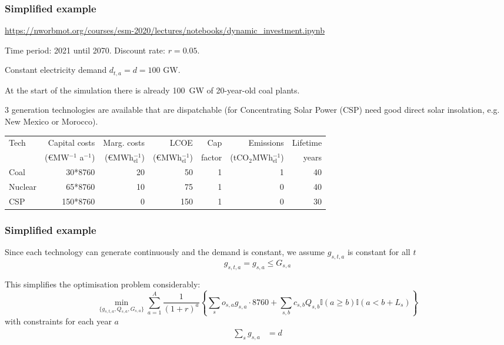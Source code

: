 \documentclass[10pt,aspectratio=169,dvipsnames]{beamer}
\newcommand{\ra}[1]{\renewcommand{\arraystretch}{#1}}
\begin{document}
\begin{frame}
  \frametitle{Simplified example}

  \url{https://nworbmot.org/courses/esm-2020/lectures/notebooks/dynamic_investment.ipynb}

  Time period: 2021 until 2070. Discount rate: $r = 0.05$.

  Constant electricity demand $d_{t,a} = d = 100$ GW.

  At the start of the simulation there is already 100~GW of 20-year-old coal plants.

  3 generation technologies are available that are dispatchable (for Concentrating Solar Power (CSP) need good direct solar insolation, e.g. New Mexico or Morocco).


  \ra{1.1}
  \begin{table}[!t]
    \begin{tabular}{lrrrrrr}
      \toprule
      Tech & Capital costs & Marg. costs & LCOE & Cap & Emissions & Lifetime    \\
       &  (\euro MW$^{-1}$ a$^{-1}$) &  (\euro MWh$_{\textrm{el}}^{-1}$) &  (\euro MWh$_{\textrm{el}}^{-1}$) & factor & (tCO$_2$MWh$_{\textrm{el}}^{-1}$) & years \\
      \midrule
      Coal &30*8760 & 20 & 50 & 1 & 1 & 40\\
      Nuclear & 65*8760 & 10 & 75 & 1 & 0 & 40 \\
      CSP & 150*8760 & 0 & 150 & 1 & 0 & 30 \\
      \bottomrule
    \end{tabular}
  \end{table}



\end{frame}

\begin{frame}
  \frametitle{Simplified example}

  Since each technology can generate continuously and the demand is constant, we assume $g_{s,t,a}$ is constant for all $t$
   \begin{equation*}
    g_{s,t,a} = g_{s,a} \leq G_{s,a}
   \end{equation*}

  This simplifies the optimisation problem considerably:
  \begin{equation*}
              \min_{\{g_{s,t,a},Q_{s,a},G_{s,a}\}} \sum_{a=1}^A \frac{1}{(1+r)^a} \left\{ \sum_{s} o_{s,a} g_{s,a}\cdot 8760 + \sum_{s,b} c_{s,b} Q_{s,b} \mathbb{I}(a  \geq b) \mathbb{I}(a < b+L_s)
 \right\}
  \end{equation*}
  with constraints for each year $a$
  \begin{align*}
    \sum_s g_{s,a} & = d
  \end{align*}
\end{frame}
\end{document}
